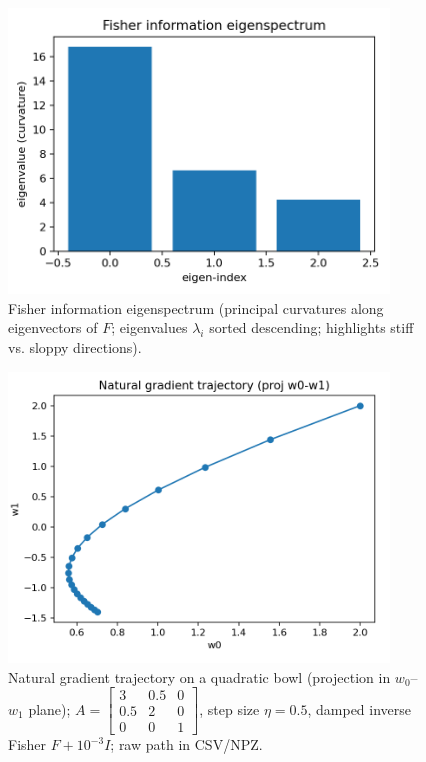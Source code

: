 \documentclass[
  10pt,
]{article}
\begin{document}
\begin{figure}[htbp]
\centering
\includegraphics[width=0.9\textwidth]{figures/fisher_information_eigenspectrum.png}
\caption{Fisher information eigenspectrum (principal curvatures along eigenvectors of $F$; eigenvalues $\lambda_i$ sorted descending; highlights stiff vs. sloppy directions).}
\label{fig:fim_eigenspectrum}
\end{figure}

\begin{figure}[htbp]
\centering
\includegraphics[width=0.9\textwidth]{figures/natural_gradient_path.png}
\caption{Natural gradient trajectory on a quadratic bowl (projection in $w_0$–$w_1$ plane); $A=\begin{bmatrix}3 & 0.5 & 0\\ 0.5 & 2 & 0\\ 0 & 0 & 1\end{bmatrix}$, step size $\eta=0.5$, damped inverse Fisher $F + 10^{-3} I$; raw path in CSV/NPZ.}
\label{fig:natural_gradient_path}
\end{figure}
\end{document}
